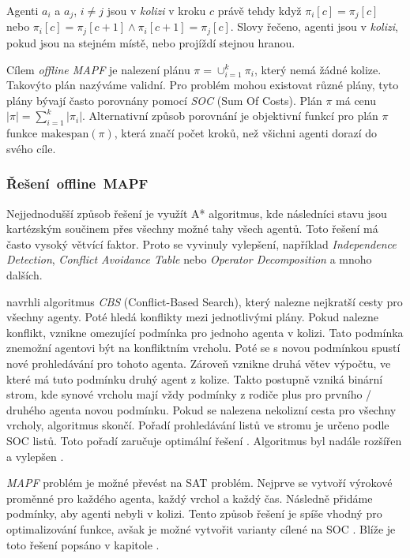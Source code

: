 Agenti $a_i$ a $a_j$, $i \neq j$ jsou v \emph{kolizi} v kroku $c$ právě tehdy když $\pi_i[c] = \pi_j[c]$ nebo
$\pi_i[c] = \pi_j[c + 1] \land \pi_i[c + 1] = \pi_j[c]$.
Slovy řečeno, agenti jsou v \emph{kolizi}, pokud jsou na stejném místě, nebo projíždí stejnou hranou.

Cílem \emph{offline MAPF} je nalezení plánu $\pi = \cup_{i=1}^{k} \pi_i$, který nemá žádné kolize.
Takovýto plán nazýváme validní.
Pro problém mohou existovat různé plány, tyto plány bývají často porovnány pomocí \emph{SOC} (Sum Of Costs).
Plán $\pi$ má cenu $|\pi| = \sum_{i=1}^{k} |\pi_i|$.
Alternativní způsob porovnání je objektivní funkcí pro plán $\pi$ funkce $\textrm{makespan}\label{str:makespan}(\pi)$,
která značí počet kroků, než všichni agenti dorazí do svého cíle.

\subsubsection{Řešení~offline~MAPF}\label{subsubsec:reseni-offline-mapf}

Nejjednodušší způsob řešení je využít A* algoritmus, kde následníci stavu jsou kartézským součinem přes všechny možné tahy všech agentů.
Toto řešení má často vysoký větvící faktor.
Proto se vyvinuly vylepšení, například \emph{Independence Detection}, \emph{Conflict Avoidance Table} nebo \emph{Operator Decomposition} \citep{Standley_2010} a mnoho dalších.

\citet*{Sharon} navrhli algoritmus \emph{CBS} (Conflict-Based Search), který nalezne nejkratší cesty pro všechny agenty.
Poté hledá konflikty mezi jednotlivými plány.
Pokud nalezne konflikt, vznikne omezující podmínka pro jednoho agenta v kolizi.
Tato podmínka znemožní agentovi být na konfliktním vrcholu.
Poté se s novou podmínkou spustí nové prohledávání pro tohoto agenta.
Zároveň vznikne druhá větev výpočtu, ve které má tuto podmínku druhý agent z kolize.
Takto postupně vzniká binární strom, kde synové vrcholu mají vždy podmínky z rodiče plus pro prvního / druhého agenta novou podmínku.
Pokud se nalezena nekolizní cesta pro všechny vrcholy, algoritmus skončí.
Pořadí prohledávání listů ve stromu je určeno podle SOC listů.
Toto pořadí zaručuje optimální řešení \citep{Sharon}.
Algoritmus byl nadále rozšířen a vylepšen \citep{Boyarski}.

\emph{MAPF} problém je možné převést na SAT problém.
Nejprve se vytvoří výrokové proměnné pro každého agenta, každý vrchol a každý čas.
Následně přidáme podmínky, aby agenti nebyli v kolizi.
Tento způsob řešení je spíše vhodný pro optimalizování  funkce,
avšak je možné vytvořit varianty cílené na SOC \citep{bartak}.
Blíže je toto řešení popsáno v kapitole .

